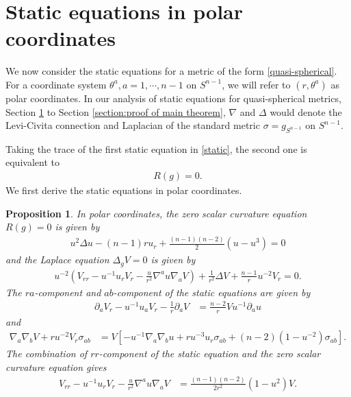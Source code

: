 \documentclass[12pt,twoside]{article}
\theoremstyle{plain}
\newtheorem{prop}[theorem]{Proposition}
\theoremstyle{definition}
\theoremstyle{remark}
\newcommand{\pl}{\partial}
\newcommand{\na}{\nabla}
\newcommand{\lt}{\left}
\newcommand{\rt}{\right}
\numberwithin{equation}{section}
\begin{document}
\section{Static equations in polar coordinates}\label{section:static equations in polar coordinates}
We now consider the static equations for a metric of the form \eqref{quasi-spherical}. For a coordinate system $\theta^a, a = 1, \cdots, n-1$ on $S^{n-1}$, we will refer to $(r,\theta^a)$ as polar coordinates. In our analysis of static equations for quasi-spherical metrics, Section \ref{section:static equations in polar coordinates} to Section \ref{section:proof of main theorem}, $\nabla$ and $\Delta$ would denote the Levi-Civita connection and Laplacian of the standard metric $\sigma = g_{S^{n-1}}$ on $S^{n-1}$.

Taking the trace of the first static equation in \eqref{static}, the second one is equivalent to 
\begin{align}
R(g) =0. \label{Rg=0}
\end{align}
We first derive the static equations in polar coordinates. 
\begin{prop} \label{derivation of static equations}
In polar coordinates, the zero scalar curvature equation $R(g)=0$ is given by 
\begin{align}\label{zero scalar curvature}
u^2 \Delta u - (n-1) r u_r+ \frac{(n-1)(n-2)}{2}(u-u^3) =0
\end{align}
and the Laplace equation $\Delta_g V =0$ is given by
\begin{align}
u^{-2} \lt( V_{rr} - u^{-1} u_r V_r - \frac{u}{r^2} \na^a u \na_a V \rt) + \frac{1}{r^2}\Delta V + \frac{n-1}{r} u^{-2} V_r =0.
\end{align} 
The $ra$-component and $ab$-component of the static equations are given by
\begin{align}\label{ra}
\pl_a V_r -u^{-1}u_a V_r - \frac{1}{r} \pl_a V &= \frac{n-2}{r} V u^{-1} \pl_a u
\end{align}
and
\begin{align}\label{ab}
\na_a \na_b V + r u^{-2}  V_r \sigma_{ab} &= V \lt[ -u^{-1} \na_a \na_b u + r u^{-3} u_r \sigma_{ab} + (n-2) (1 - u^{-2}) \sigma_{ab}\rt].
\end{align}
The combination of $rr$-component of the static equation and the zero scalar curvature equation gives
\begin{align}\label{rr}
V_{rr} - u^{-1} u_r V_r - \frac{u}{r^2} \na^a u \na_a V &= \frac{(n-1)(n-2)}{2r^2} (1-u^2) V.
\end{align}
\end{prop}
\end{document}
